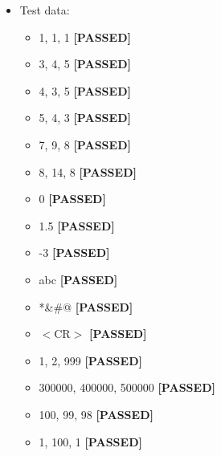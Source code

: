 \documentclass{article}
\begin{document}
\begin{itemize}
    \item Test data:
\begin{itemize}
    \item 1, 1, 1 \textbf{[PASSED]}
    \item 3, 4, 5 \textbf{[PASSED]}
    \item 4, 3, 5 \textbf{[PASSED]}
    \item 5, 4, 3 \textbf{[PASSED]}
    \item 7, 9, 8 \textbf{[PASSED]}
    \item 8, 14, 8 \textbf{[PASSED]}
    \item 0 \textbf{[PASSED]}
    \item 1.5 \textbf{[PASSED]}
    \item -3 \textbf{[PASSED]}
    \item abc \textbf{[PASSED]}
    \item *\&\#@ \textbf{[PASSED]}
    \item $<$CR$>$ \textbf{[PASSED]}
    \item 1, 2, 999 \textbf{[PASSED]}
    \item 300000, 400000, 500000 \textbf{[PASSED]}
    \item 100, 99, 98 \textbf{[PASSED]}
    \item 1, 100, 1 \textbf{[PASSED]}
\end{itemize}
\end{itemize}
\end{document}

